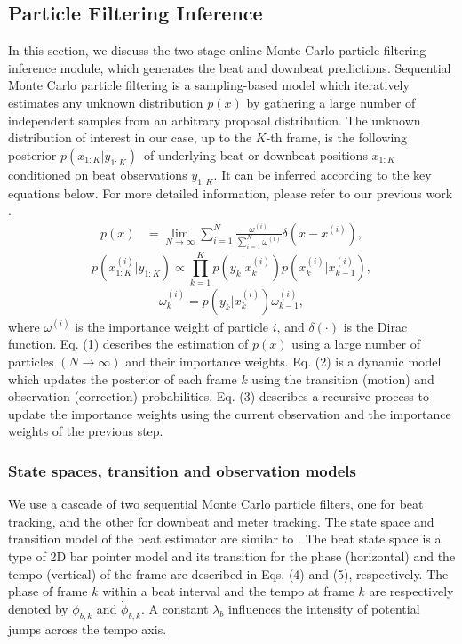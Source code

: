 \documentclass{article}
\begin{document}
\subsection{Particle Filtering Inference}
In this section, we discuss the two-stage online Monte Carlo particle filtering inference module, which generates the beat and downbeat predictions. Sequential Monte Carlo particle filtering is a sampling-based model which iteratively estimates any unknown distribution $p(x)$ by gathering a large number of independent samples from an arbitrary proposal distribution. The unknown distribution of interest in our case, up to the $K$-th frame, is the following posterior $p(x_{1:K} | y_{1:K})$\ of underlying beat or downbeat positions $x_{1:K}$ conditioned on beat observations $y_{1:K}$. It can be inferred according to the key equations below. For more detailed information, please refer to our previous work \cite{Heydari}.
\begin{align}
    p(x) &= \lim_{N \to \infty} \sum^N_{i=1} \frac{\omega^{(i)}}{\sum^N_{i=1} \omega^{(i)}} \delta \left(x - x^{(i)}\right),
\end{align}
\begin{equation}
    p\left(x_{1:K}^{(i)} | y_{1:K}\right) \propto \prod_{k=1}^K p\left(y_k|x_k^{(i)}\right) p\left(x_k^{(i)}|x_{k-1}^{(i)}\right),
\end{equation}
\begin{align}
\omega_k^{(i)} = p \left( y_k|x_k^{(i)} \right) \omega_{k-1}^{(i)},
\end{align}
where $\omega^{(i)}$ is the importance weight of particle $i$, and $\delta(\cdot)$ is the Dirac function. Eq. (1) describes the estimation of $p(x)$ using a large number of particles $(N \rightarrow \infty )$ and their importance weights. Eq. (2) is a dynamic model which updates the posterior of each frame $k$ using the transition (motion) and observation (correction) probabilities. Eq. (3) describes a recursive process to update the importance weights using the current observation and the importance weights of the previous step.         


\subsubsection{State spaces, transition and observation models}
We use a cascade of two sequential Monte Carlo particle filters, one for beat tracking, and the other for downbeat and meter tracking. The state space and transition model of the beat estimator are similar to \cite{Krebs:2}. The beat state space is a type of 2D bar pointer model and its transition for the phase (horizontal) and the tempo (vertical) of the frame are described in Eqs. (4) and (5), respectively. The phase of frame $k$ within a beat interval and the tempo at frame $k$ are respectively denoted by $\phi_{b,k}$ and $\dot\phi_{b,k}$. A constant $\lambda_{b}$ influences the intensity of potential jumps across the tempo axis.
\end{document}
